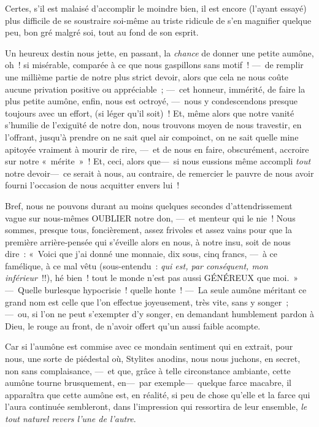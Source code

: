 \documentclass[french,twoside]{book} %
\newcommand{\bibl}[1]{{\RaggedLeft{#1}\par\bigskip}}
\begin{document}
\bibl{N. T.}
\noindent Certes, s’il est malaisé d’accomplir le moindre bien, il est encore (l’ayant essayé) plus difficile de se soustraire soi-même au triste ridicule de s’en magnifier quelque peu, bon gré malgré soi, tout au fond de son esprit.\par
Un heureux destin nous jette, en passant, la \emph{chance} de donner une petite aumône, oh ! si misérable, comparée à ce que nous gaspillons sans motif ! — de remplir une millième partie de notre plus strict devoir, alors que cela ne nous coûte aucune privation positive ou appréciable ; — cet honneur, immérité, de faire la plus petite aumône, enfin, nous est octroyé, — nous y   condescendons presque toujours avec un effort, (si léger qu’il soit) ! Et, même alors que notre vanité s’humilie de l’exiguïté de notre don, nous trouvons moyen de nous travestir, en l’offrant, jusqu’à prendre on ne sait quel air compoinct, on ne sait quelle mine apitoyée vraiment à mourir de rire, — et de nous en faire, obscurément, accroire sur notre « mérite » ! Et, ceci, alors que— si nous eussions même accompli \emph{tout} notre devoir— ce serait à nous, au contraire, de remercier le pauvre de nous avoir fourni l’occasion de nous acquitter envers lui !\par
Bref, nous ne pouvons durant au moins quelques secondes d’attendrissement vague sur nous-mêmes OUBLIER notre don, — et menteur qui le nie ! Nous sommes, presque tous, foncièrement, assez frivoles et assez vains pour que la première arrière-pensée qui s’éveille alors en nous, à notre insu, soit de nous dire : « Voici que j’ai donné une monnaie, dix sous, cinq francs, — à ce famélique, à ce mal vêtu (sous-entendu : \emph{qui est, par conséquent, mon inférieur} !!), hé bien ! tout le monde n’est pas aussi   GÉNÉREUX que moi. » — Quelle burlesque hypocrisie ! quelle honte ! — La seule aumône méritant ce grand nom est celle que l’on effectue joyeusement, très vite, sans y songer ; — ou, si l’on ne peut s’exempter d’y songer, en demandant humblement pardon à Dieu, le rouge au front, de n’avoir offert qu’un aussi faible acompte.\par
Car si l’aumône est commise avec ce mondain sentiment qui en extrait, pour nous, une sorte de piédestal où, Stylites anodins, nous nous juchons, en secret, non sans complaisance, — et que, grâce à telle circonstance ambiante, cette aumône tourne brusquement, en— par exemple— quelque farce macabre, il apparaîtra que cette aumône est, en réalité, si peu de chose qu’elle et la farce qui l’aura continuée sembleront, dans l’impression qui ressortira de leur ensemble, \emph{le tout naturel revers l’une de l’autre}.\par
\end{document}

